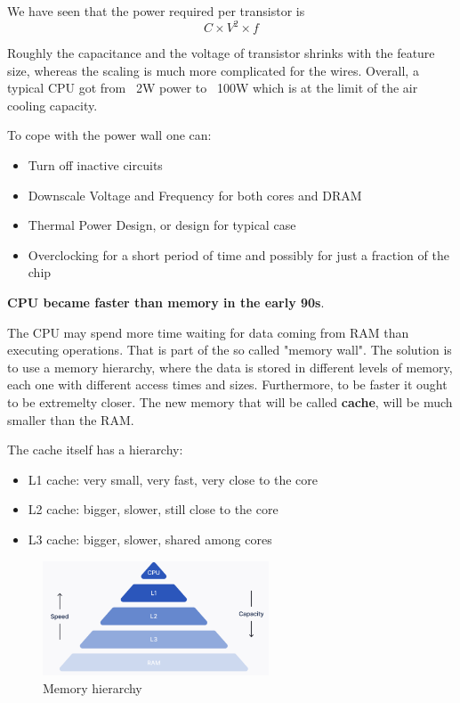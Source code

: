 We have seen that the power required per transistor is 
\[
    C \times V^2 \times f   
\]

Roughly the capacitance and the voltage of transistor shrinks with the feature size, whereas the scaling is much more complicated for the wires. Overall, a typical CPU got from ~2W power to ~100W which is at the limit of the air cooling capacity. 

To cope with the power wall one can:
\begin{itemize}
    \item Turn off inactive circuits 
    \item Downscale Voltage and Frequency for both cores and DRAM 
    \item Thermal Power Design, or design for typical case 
    \item Overclocking for a short period of time and possibly for just a fraction of the chip
\end{itemize}

\vspace{0.5cm}
\textbf{CPU became faster than memory in the early 90s}.

The CPU may spend more time waiting for data coming from RAM than executing operations. That is part of the so called "memory wall". The solution is to use a memory hierarchy, where the data is stored in different levels of memory, each one with different access times and sizes.
Furthermore, to be faster it ought to be extremelty closer. The new memory that will be called \textbf{cache}, will be much smaller than the RAM.

The cache itself has a hierarchy:
\begin{itemize}
    \item L1 cache: very small, very fast, very close to the core
    \item L2 cache: bigger, slower, still close to the core
    \item L3 cache: bigger, slower, shared among cores
\end{itemize}

\begin{figure}[H]
    \centering
    \includegraphics[width=0.6\textwidth]{assets/opt4.png}
    \caption{Memory hierarchy}
\end{figure}

